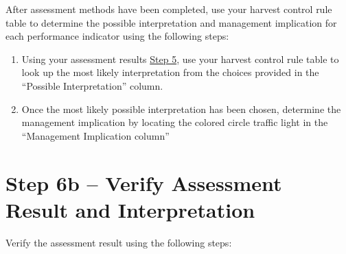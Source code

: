 \documentclass[]{book}
\begin{document}
After assessment methods have been completed, use your harvest control
rule table to determine the possible interpretation and management
implication for each performance indicator using the following steps:

\begin{enumerate}
\def\labelenumi{\alph{enumi})}
\item
  Using your assessment results \protect\hyperlink{Step5}{Step 5}, use
  your harvest control rule table to look up the most likely
  interpretation from the choices provided in the ``Possible
  Interpretation'' column.
\item
  Once the most likely possible interpretation has been chosen,
  determine the management implication by locating the colored circle
  traffic light in the ``Management Implication column''
\end{enumerate}

\section{Step 6b -- Verify Assessment Result and
Interpretation}\label{step-6b-verify-assessment-result-and-interpretation}

Verify the assessment result using the following steps:
\end{document}
